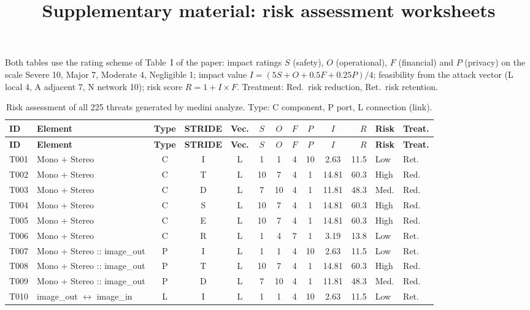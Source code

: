 \documentclass[9pt]{extarticle}
\title{Supplementary material: risk assessment worksheets}
\date{}
\begin{document}
\maketitle
\vspace{-2em}
\noindent Both tables use the rating scheme of Table~I of the paper: impact
ratings $S$ (safety), $O$ (operational), $F$ (financial) and $P$ (privacy) on
the scale Severe 10, Major 7, Moderate 4, Negligible 1; impact value
$I=(5S+O+0.5F+0.25P)/4$; feasibility from the attack vector (L local 4,
A adjacent 7, N network 10); risk score $R=1+I\times F$. Treatment: Red.\ risk
reduction, Ret.\ risk retention.

\small
\setlength{\tabcolsep}{3.5pt}
\begin{longtable}{l>{\raggedright\arraybackslash}p{6.3cm}ccccccccrll}
\caption{Risk assessment of all 225 threats generated by medini analyze. Type: C component, P port, L connection (link).}\label{tab:s1}\\
\toprule
\textbf{ID} & \textbf{Element} & \textbf{Type} & \textbf{STRIDE} & \textbf{Vec.} & $S$ & $O$ & $F$ & $P$ & $I$ & $R$ & \textbf{Risk} & \textbf{Treat.} \\
\midrule
\endfirsthead
\toprule
\textbf{ID} & \textbf{Element} & \textbf{Type} & \textbf{STRIDE} & \textbf{Vec.} & $S$ & $O$ & $F$ & $P$ & $I$ & $R$ & \textbf{Risk} & \textbf{Treat.} \\
\midrule
\endhead
\bottomrule
\endfoot
T001 & Mono + Stereo & C & I & L & 1 & 1 & 4 & 10 & 2.63 & 11.5 & Low & Ret. \\
T002 & Mono + Stereo & C & T & L & 10 & 7 & 4 & 1 & 14.81 & 60.3 & High & Red. \\
T003 & Mono + Stereo & C & D & L & 7 & 10 & 4 & 1 & 11.81 & 48.3 & Med. & Red. \\
T004 & Mono + Stereo & C & S & L & 10 & 7 & 4 & 1 & 14.81 & 60.3 & High & Red. \\
T005 & Mono + Stereo & C & E & L & 10 & 7 & 4 & 1 & 14.81 & 60.3 & High & Red. \\
T006 & Mono + Stereo & C & R & L & 1 & 4 & 7 & 1 & 3.19 & 13.8 & Low & Ret. \\
T007 & Mono + Stereo :: image\_out & P & I & L & 1 & 1 & 4 & 10 & 2.63 & 11.5 & Low & Ret. \\
T008 & Mono + Stereo :: image\_out & P & T & L & 10 & 7 & 4 & 1 & 14.81 & 60.3 & High & Red. \\
T009 & Mono + Stereo :: image\_out & P & D & L & 7 & 10 & 4 & 1 & 11.81 & 48.3 & Med. & Red. \\
T010 & image\_out $\leftrightarrow$ image\_in & L & I & L & 1 & 1 & 4 & 10 & 2.63 & 11.5 & Low & Ret. \\

\end{longtable}
\end{document}
